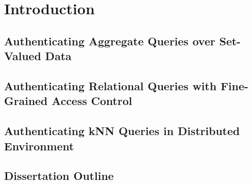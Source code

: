 \chapter{Introduction}\label{chap:intro}

\section{Authenticating Aggregate Queries over Set-Valued Data}

\section{Authenticating Relational Queries with Fine-Grained Access Control}

\section{Authenticating kNN Queries in Distributed Environment}

\section{Dissertation Outline}

